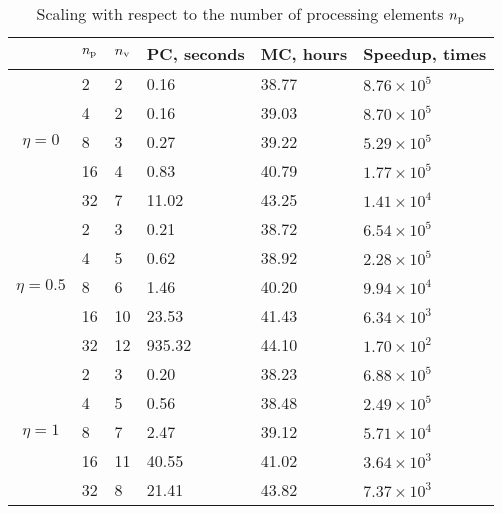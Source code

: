 \begin{table*}
\begin{minipage}{0.49\linewidth}
  \centering
  \caption{Scaling with respect to the number of processing elements \textnormal{${n_\text{p}}$}}
  \vspace{-0.5em}
  \begin{tabular*}{1\linewidth}{cL{10pt}L{10pt}R{45pt}R{45pt}R{60pt}}
    \toprule
    & ${n_\text{p}}$ & ${n_\text{v}}$ & PC, seconds & MC, hours & Speedup, times \\
    \midrule
    \midrule
    &  2 & 2 &  0.16 & 38.77 & $8.76 \times 10^5$ \\
    &  4 & 2 &  0.16 & 39.03 & $8.70 \times 10^5$ \\
    &  8 & 3 &  0.27 & 39.22 & $5.29 \times 10^5$ \\
    & 16 & 4 &  0.83 & 40.79 & $1.77 \times 10^5$ \\
    & 32 & 7 & 11.02 & 43.25 & $1.41 \times 10^4$ \\
    \midrule
    &  2 &  3 &   0.21 & 38.72 & $6.54 \times 10^5$ \\
    &  4 &  5 &   0.62 & 38.92 & $2.28 \times 10^5$ \\
    &  8 &  6 &   1.46 & 40.20 & $9.94 \times 10^4$ \\
    & 16 & 10 &  23.53 & 41.43 & $6.34 \times 10^3$ \\
    & 32 & 12 & 935.32 & 44.10 & $1.70 \times 10^2$ \\
    \midrule
    &  2 &  3 &  0.20 & 38.23 & $6.88 \times 10^5$ \\
    &  4 &  5 &  0.56 & 38.48 & $2.49 \times 10^5$ \\
    &  8 &  7 &  2.47 & 39.12 & $5.71 \times 10^4$ \\
    & 16 & 11 & 40.55 & 41.02 & $3.64 \times 10^3$ \\
    & 32 &  8 & 21.41 & 43.82 & $7.37 \times 10^3$ \\
    \bottomrule
  \end{tabular*}
  \vspace{-0.5em}
\end{minipage}

\end{table*}

